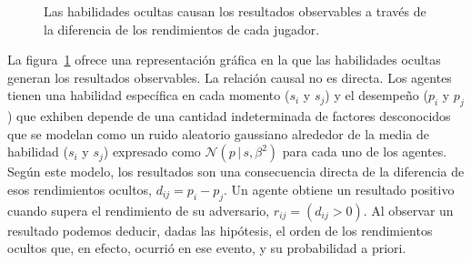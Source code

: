 \documentclass[11pt,twoside,spanish]{report} %
\begin{document}
\begin{figure}
	\footnotesize
	\caption{Las habilidades ocultas causan los resultados observables a trav\'es de la diferencia de los rendimientos de cada jugador.}
	\label{fig:generative_model}
\end{figure}

La figura~\ref{fig:generative_model} ofrece una representaci\'on gr\'afica en la que las habilidades ocultas generan los resultados observables.
La relaci\'on causal no es directa.
Los agentes tienen una habilidad espec\'ifica en cada momento ($s_i$ y $s_j$) y el desempe\~no ($p_i$ y $p_j$) que exhiben depende de una cantidad indeterminada de factores desconocidos que se modelan como un ruido aleatorio gaussiano alrededor de la media de habilidad ($s_i$ y $s_j$) expresado como $\mathcal{N}(p\,|\,s,\beta^2)$ para cada uno de los agentes.
Seg\'un este modelo, los resultados son una consecuencia directa de la diferencia de esos rendimientos ocultos, $d_{ij} = p_i - p_j$.
Un agente obtiene un resultado positivo cuando supera el rendimiento de su adversario, $r_{ij} = (d_{ij} > 0)$.
Al observar un resultado podemos deducir, dadas las hip\'otesis, el orden de los rendimientos ocultos que, en efecto, ocurri\'o en ese evento, y su probabilidad a priori.
\end{document}
